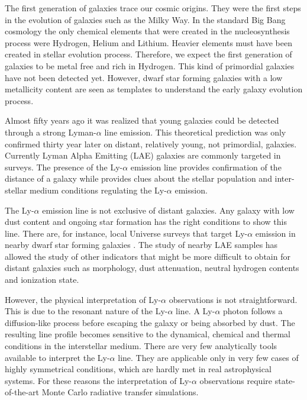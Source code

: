 \documentclass[a4paper, usenatbib, 12pt]{article}
\begin{document}
{The first generation of galaxies trace our cosmic origins. 
They were the first steps in the evolution of galaxies such as the Milky
Way. 
In the standard Big Bang cosmology the only chemical elements that
were created in the nucleosynthesis process were Hydrogen, Helium and
Lithium.  
Heavier elements must have been created in stellar evolution process. 
Therefore, we expect the first generation of
galaxies to be metal free and rich in Hydrogen. 
This kind of primordial galaxies have not been detected yet. 
However, dwarf star forming galaxies with a low metallicity content
are seen as templates to understand the early galaxy evolution process. 

Almost fifty years ago \cite{PartridgePeebles} it was realized that
young galaxies could be detected through a strong Lyman-$\alpha$ line
emission.  
This theoretical prediction was only confirmed thirty year later on
distant, relatively young, not primordial, galaxies.
Currently Lyman Alpha Emitting (LAE) galaxies are commonly targeted
in surveys. 
The presence of the Ly-$\alpha$ emission line provides confirmation of
the distance of a galaxy while provides clues about the stellar
population and inter-stellar medium conditions regulating the
Ly-$\alpha$ emission. 

The Ly-$\alpha$ emission line is not exclusive of distant galaxies. 
Any galaxy with low dust content and ongoing star formation has the
right conditions to show this line.  
There are, for instance,  local Universe surveys that target
Ly-$\alpha$ emission in nearby dwarf star forming galaxies 
\cite{LARS}. 
The study of nearby LAE samples has allowed the study of other
indicators that might be more difficult to obtain for distant galaxies
such as morphology, dust attenuation, neutral hydrogen contents and
ionization state.  

However, the physical interpretation of Ly-$\alpha$ observations is
not straightforward. 
This is due to the resonant nature of the Ly-$\alpha$ line. 
A Ly-$\alpha$ photon follows a diffusion-like process before escaping
the galaxy or being absorbed by dust. 
The resulting line profile becomes sensitive to the dynamical, chemical
and thermal conditions in the interstellar medium. 
There are very few analytically tools available to interpret the
Ly-$\alpha$ line.
They are applicable only in very few cases of highly symmetrical
conditions, which are hardly met in real astrophysical systems.
For these reasons the interpretation of Ly-$\alpha$ observations
require state-of-the-art Monte Carlo radiative transfer simulations.   


}
\end{document}
